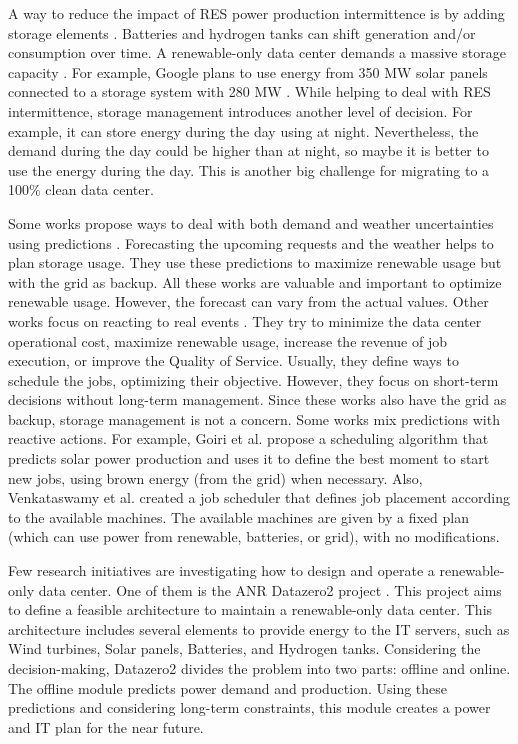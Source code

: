 A way to reduce the impact of RES power production intermittence is by adding storage elements \cite{rostirolla2022survey}. Batteries and hydrogen tanks can shift generation and/or consumption over time. A renewable-only data center demands a massive storage capacity \cite{rostirolla2022survey}. For example, Google plans to use energy from 350 MW solar panels connected to a storage system with 280 MW \cite{branscombe2020google}. While helping to deal with RES intermittence, storage management introduces another level of decision. For example, it can store energy during the day using at night. Nevertheless, the demand during the day could be higher than at night, so maybe it is better to use the energy during the day. This is another big challenge for migrating to a 100\% clean data center.

Some works propose ways to deal with both demand and weather uncertainties using predictions \cite{wiesner2022cucumber, haddad2019mixed, lu_energy-efficient_2018, goiri2015matching}. Forecasting the upcoming requests and the weather helps to plan storage usage. They use these predictions to maximize renewable usage but with the grid as backup. All these works are valuable and important to optimize renewable usage. However, the forecast can vary from the actual values. Other works focus on reacting to real events \cite{liu2023online, he2022online, caux2019phase, sharma2011blink}. They try to minimize the data center operational cost, maximize renewable usage, increase the revenue of job execution, or improve the Quality of Service. Usually, they define ways to schedule the jobs, optimizing their objective. However, they focus on short-term decisions without long-term management. Since these works also have the grid as backup, storage management is not a concern. Some works mix predictions with reactive actions. For example, Goiri et al. \cite{goiri2015matching} propose a scheduling algorithm that predicts solar power production and uses it to define the best moment to start new jobs, using brown energy (from the grid) when necessary. Also, Venkataswamy et al. \cite{venkataswamy2023rare} created a job scheduler that defines job placement according to the available machines. The available machines are given by a fixed plan (which can use power from renewable, batteries, or grid), with no modifications.

Few research initiatives are investigating how to design and operate a renewable-only data center. One of them is the ANR Datazero2 project \cite{Datazero}. This project aims to define a feasible architecture to maintain a renewable-only data center. This architecture includes several elements to provide energy to the IT servers, such as Wind turbines, Solar panels, Batteries, and Hydrogen tanks. Considering the decision-making, Datazero2 divides the problem into two parts: offline and online. The offline module predicts power demand and production. Using these predictions and considering long-term constraints, this module creates a power and IT plan for the near future. 

